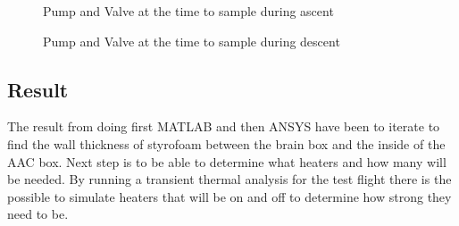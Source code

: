 \begin{figure}[H]
    \centering
    \hifll
    \caption{Pump and Valve at the time to sample during ascent}
    \label{fig:Pump-Valve-ascent-sample}
\end{figure}

\begin{figure}[H]
    \centering
    \hifll
    \caption{Pump and Valve at the time to sample during descent}
    \label{fig:Pump-Valve-ascent-sample-descent}
\end{figure}

\subsection{Result}
The result from doing first MATLAB and then ANSYS have been to iterate to find the wall thickness of styrofoam between the brain box and the inside of the AAC box. Next step is to be able to determine what heaters and how many will be needed. By running a transient thermal analysis for the test flight there is the possible to simulate heaters that will be on and off to determine how strong they need to be.

